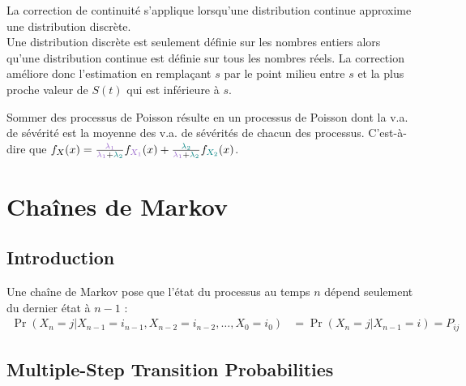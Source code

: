 \documentclass[10pt, french]{article}
\begin{document}
\begin{multicols*}{2}
\begin{definitionNOHFILLpropos}
La correction de continuité s'applique lorsqu'une distribution continue approxime une distribution discrète. \\

Une distribution discrète est seulement définie sur les nombres entiers alors qu'une distribution continue est définie sur tous les nombres réels. La correction améliore donc l'estimation en remplaçant $s$ par le point milieu entre $s$ et la plus proche valeur de $S(t)$ qui est inférieure à $s$.
\end{definitionNOHFILLpropos}

Sommer des processus de Poisson résulte en un processus de Poisson dont la v.a. de sévérité est la moyenne des v.a. de sévérités de chacun des processus. C'est-à-dire que $f_{X}(x) = \frac{\textcolor{amethyst}{\lambda_{1}}}{\textcolor{amethyst}{\lambda_{1}} + \textcolor{teal}{\lambda_{2}}} f_{\textcolor{amethyst}{X_{1}}}(x) + \frac{\textcolor{teal}{\lambda_{2}}}{\textcolor{amethyst}{\lambda_{1}} + \textcolor{teal}{\lambda_{2}}} f_{\textcolor{teal}{X_{2}}}(x)$.



\pagebreak
\section{Chaînes de Markov}
\subsection{Introduction}

Une chaîne de Markov pose que l'état du processus au temps $n$ dépend seulement du dernier état à $n	-	1$ : 
\begin{align*}
	\Pr(X_{n}	=	j | X_{n - 1}	=	i_{n - 1}, X_{n - 2} = i_{n - 2}, \dots, X_{0}	=	i_{0})
	&=	\Pr(X_{n}	=	j | X_{n - 1}	=	i)
	=	P_{ij}
\end{align*}



\subsection{Multiple-Step Transition Probabilities}

\end{multicols*}
\end{document}

